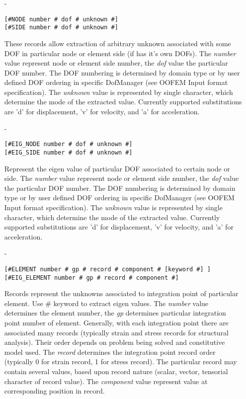 \begin{itemize}
\item[-]
\begin{verbatim}
[#NODE number # dof # unknown #]
[#SIDE number # dof # unknown #]
\end{verbatim}
These records allow extraction of arbitrary unknown associated with
some DOF in particular node or element side (if has it's own DOFs).
The {\em number} value represent node or element side number, the {\em
dof} value the particular DOF number. The DOF numbering is determined
by domain type or by user defined DOF ordering in specific
DofManager (see OOFEM Input format specification). The {\em unknown} value
is represented by single character, which determine the mode of the
extracted value. Currently supported substitutions are 'd' for displacement, 'v' for velocity,
and 'a' for acceleration.
\item[-]
\begin{verbatim}
[#EIG_NODE number # dof # unknown #]
[#EIG_SIDE number # dof # unknown #]
\end{verbatim}
Represent the eigen value of particular DOF associated to certain
node or side. The {\em number} value represent node or element side number, the {\em
dof} value the particular DOF number. The DOF numbering is determined
by domain type or by user defined DOF ordering in specific
DofManager (see OOFEM Input format specification). The {\em unknown} value
is represented by single character, which determine the mode of the
extracted value. Currently supported substitutions are 'd' for displacement, 'v' for velocity,
and 'a' for acceleration.
\item[-]
\begin{verbatim}
[#ELEMENT number # gp # record # component # [keyword #] ]
[#EIG_ELEMENT number # gp # record # component #]
\end{verbatim}
Records represent the unknowns associated to integration point of
particular element. Use \# keyword  to extract eigen
values. The {\em number} value determines the element number, the {\em
gp} determines particular integration point number of element. 
Generally, with each integration point there are associated many
records (typically strain and stress records for structural
analysis). Their order depends on problem being solved and
constitutive model used. The {\em record} determines the integration
point record order (typically 0 for strain record, 1 for stress
record). The particular record may contain several values, based upon
record nature (scalar, vector, tensorial character of record value).
The {\em  component} value represent value at corresponding position
in record. 


\end{itemize}
